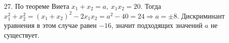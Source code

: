 27. По теореме Виета $x_1+x_2=a,\ x_1x_2=20.$ Тогда $x_1^2+x_2^2=(x_1+x_2)^2-2x_1x_2=a^2-40=24\Rightarrow a=\pm8.$ Дискриминант уравнения в этом случае равен $-16$, значит подходящих значений $a$ не существует.\\
